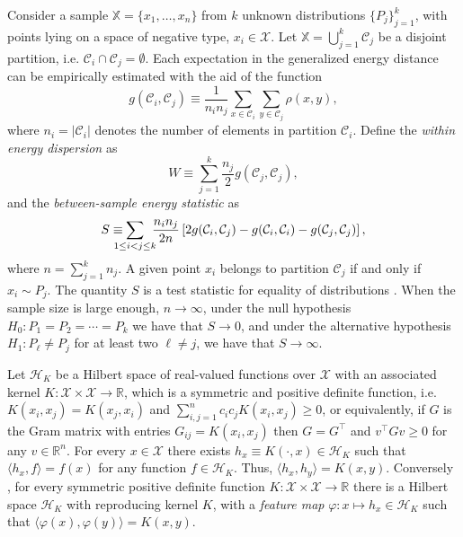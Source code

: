 \documentclass[twoside]{article}
\newcommand\kk{K}
\newcommand\kkk{h}
\newcommand\Hk{{\mathcal{H}}_{\kk}}
\newcommand\HH{\mathcal{H}}
\newcommand\C{{\mathcal{C}}}
\begin{document}
Consider a sample $\mathbb{X} = \{ x_1,\dotsc, x_n \}$ 
from $k$ unknown distributions $\{ P_j \}_{j=1}^k$,
with points lying on a space of negative type,
$x_i \in \mathcal{X}$.
Let $\mathbb{X} = \bigcup_{j=1}^k \C_j$ be a disjoint
partition, i.e. $\C_i \cap \C_j = \emptyset$.
Each expectation in the generalized energy distance
can be empirically estimated with the aid of the
function
\begin{equation}
\label{eq:g_def}
g (\C_i, \C_j) \equiv 
\dfrac{1}{n_i n_j}
\sum_{x \in \C_i} 
\sum_{y \in \C_j} \rho(x, y) ,
\end{equation}
where $n_i = |\C_i|$ denotes the number of elements in partition
$\C_i$. 
Define the \emph{within energy dispersion} as
\begin{equation}
\label{eq:within}
W \equiv
\sum_{j=1}^{k} \dfrac{n_j}{2} g(\C_j, \C_j),
\end{equation}
and the \emph{between-sample energy statistic} as
\begin{equation}
\label{eq:between}
S \equiv \hspace{-1em}
\sum_{1 \le  i < j \le k } \hspace{-.5em} \dfrac{n_i n_{j}}{2 n} \left[
2 g(\C_i, \C_j) - 
g(\C_i, \C_i) - 
g(\C_j, \C_j)
\right],
\end{equation}
where $n = \sum_{j=1}^k n_j$.
A given point $x_i$ belongs to partition $\C_j$
if and only if $x_i \sim P_j$. 
The quantity $S$ is
a test statistic for equality of distributions
\citep{Szkely2013}.
When the sample size is large enough, $n\to \infty$,
under the null hypothesis $H_0: P_1=P_2=\dotsm=P_k$ we have that
$S\to 0$, 
and under
the alternative hypothesis $H_1: P_\ell \ne P_j$ for at least two $\ell\ne j$, 
we have that $S \to \infty$.

Let $\HH_\kk$ be a Hilbert space of real-valued functions
over $\mathcal{X}$ with an associated kernel
$\kk : \mathcal{X} \times \mathcal{X} \to 
\mathbb{R}$, which is a symmetric and positive definite function, i.e. 
$\kk(x_i,x_j) = \kk(x_j,x_i)$ and 
$\sum_{i,j=1}^n c_i c_j \kk(x_i, x_j) \ge 0$, or equivalently,
if $G$ is the Gram matrix with entries $G_{ij} = \kk(x_i,x_j)$
then $G = G^\top$ and $v^\top G v \ge 0$ for any $v \in \mathbb{R}^n$.
For every $x \in \mathcal{X}$ there exists 
$h_x \equiv \kk(\cdot,x) \in \Hk$ such that  $\langle h_x, f \rangle = f(x)$
for any function $f \in \Hk$. Thus, 
$\langle h_x, h_y \rangle = \kk(x,y)$.
Conversely \citep{Aronszajn},  
for every symmetric
positive definite function $\kk: \mathcal{X}\times \mathcal{X} \to
\mathbb{R}$ there is a Hilbert space $\Hk$ with reproducing
kernel $\kk$, with a 
\emph{feature map} $\varphi: x \mapsto \kkk_x \in \Hk$ such
that $\langle \varphi(x), \varphi(y) \rangle = \kk(x, y)$.
\end{document}

